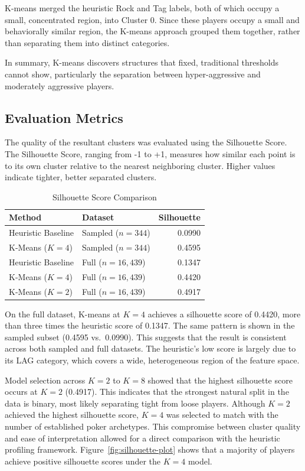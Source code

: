 \documentclass[sigconf]{acmart}
\begin{document}
K-means merged the heuristic Rock and Tag labels, both of which occupy a small, concentrated region, into Cluster 0. Since these players occupy a small and behaviorally similar region, the K-means approach grouped them together, rather than separating them into distinct categories. 

In summary, K-means discovers structures that fixed, traditional thresholds cannot show, particularly the separation between hyper-aggressive and moderately aggressive players. 

\subsection{Evaluation Metrics}
The quality of the resultant clusters was evaluated using the Silhouette Score. The Silhouette Score, ranging from -1 to +1,  measures how similar each point is to its own cluster relative to the nearest neighboring cluster. Higher values indicate tighter, better separated clusters. 

\begin{table}[t]
  \caption{Silhouette Score Comparison}
  \label{tab:silhouette-comparison}
  \centering
  \begin{tabular}{llr}
    \toprule
    Method & Dataset & Silhouette \\
    \midrule
    Heuristic Baseline & Sampled ($n=344$) & 0.0990 \\
    K-Means ($K=4$) & Sampled ($n=344$) & 0.4595 \\
    \midrule
    Heuristic Baseline & Full ($n=16{,}439$) & 0.1347 \\
    K-Means ($K=4$) & Full ($n=16{,}439$) & 0.4420 \\
    K-Means ($K=2$) & Full ($n=16{,}439$) & 0.4917 \\
    \bottomrule
  \end{tabular}
\end{table}

On the full dataset, K-means at $K=4$ achieves a silhouette score of 0.4420, more than three times the heuristic score of 0.1347. The same pattern is shown in the sampled subset (0.4595 vs.\ 0.0990). This suggests that the result is consistent across both sampled and full datasets. The heuristic's low score is largely due to its LAG category, which covers a wide, heterogeneous region of the feature space.

Model selection across $K=2$ to $K=8$ showed that the highest silhouette score occurs at $K=2$ (0.4917). This indicates that the strongest natural split in the data is binary, most likely separating tight from loose players. Although $K=2$ achieved the highest silhouette score, $K=4$ was selected to match with the number of established poker archetypes. This compromise between cluster quality and ease of interpretation allowed for a direct comparison with the heuristic profiling framework. Figure~\ref{fig:silhouette-plot} shows that a majority of players achieve positive silhouette scores under the $K = 4$ model.  
\end{document}
